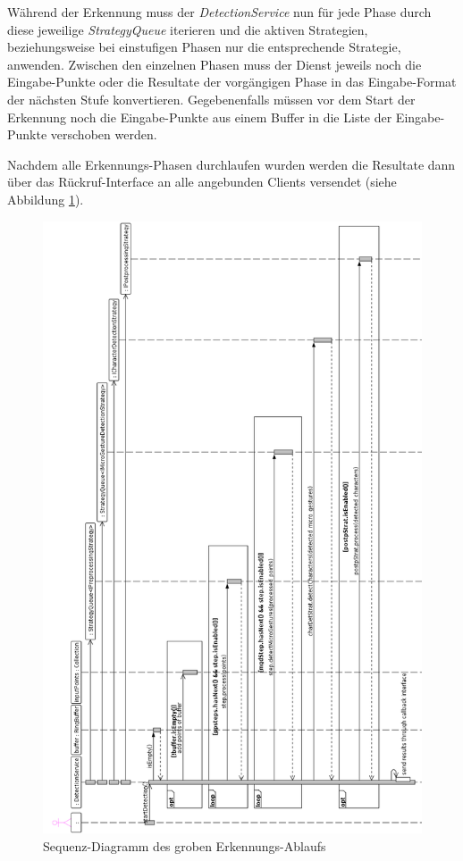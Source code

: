 Während der Erkennung muss der \emph{DetectionService} nun für jede Phase durch diese jeweilige \emph{StrategyQueue} iterieren und die aktiven Strategien, beziehungsweise bei einstufigen Phasen nur die entsprechende Strategie, anwenden. Zwischen den einzelnen Phasen muss der Dienst jeweils noch die Eingabe-Punkte oder die Resultate der vorgängigen Phase in das Eingabe-Format der nächsten Stufe konvertieren. Gegebenenfalls müssen vor dem Start der Erkennung noch die Eingabe-Punkte aus einem Buffer in die Liste der Eingabe-Punkte verschoben werden.

Nachdem alle Erkennungs-Phasen durchlaufen wurden werden die Resultate dann über das Rückruf-Interface an alle angebunden Clients versendet (siehe Abbildung \ref{fig:sd_detection}).

\begin{figure}[bh!]
   \centering
   \includegraphics[scale=0.45]{img/uml_sd_detection} 
   \caption{Sequenz-Diagramm des groben Erkennungs-Ablaufs}
   \label{fig:sd_detection}
\end{figure}

